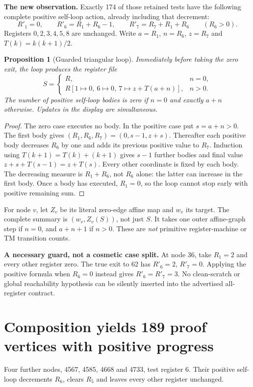 \documentclass[11pt]{article}
\newtheorem{proposition}{Proposition}[section]
\begin{document}
\textbf{The new observation.} Exactly 174 of those retained tests have the following complete positive self-loop action, already including that decrement:
\[
 R'_1=0,\qquad R'_6=R_1+R_6-1,\qquad
 R'_7=R_7+R_1+R_6\qquad(R_6>0).
\]
Registers $0,2,3,4,5,8$ are unchanged. Write $a=R_1$, $n=R_6$, $z=R_7$ and $T(k)=k(k+1)/2$.

\begin{proposition}[Guarded triangular loop]
Immediately before taking the zero exit, the loop produces the register file
\[
 S=\begin{cases}
 R,&n=0,\\
 R[1\mapsto0,\ 6\mapsto0,\ 7\mapsto z+T(a+n)],&n>0.
 \end{cases}
\]
The number of positive self-loop bodies is zero if $n=0$ and exactly $a+n$ otherwise. Updates in the display are simultaneous.
\end{proposition}
\begin{proof}
The zero case executes no body. In the positive case put $s=a+n>0$. The first body gives $(R_1,R_6,R_7)=(0,s-1,z+s)$. Thereafter each positive body decreases $R_6$ by one and adds its previous positive value to $R_7$. Induction using $T(k+1)=T(k)+(k+1)$ gives $s-1$ further bodies and final value $z+s+T(s-1)=z+T(s)$. Every other coordinate is fixed by each body. The decreasing measure is $R_1+R_6$, not $R_6$ alone: the latter can increase in the first body. Once a body has executed, $R_1=0$, so the loop cannot stop early with positive remaining sum.
\end{proof}

For node $v$, let $Z_v$ be its literal zero-edge affine map and $w_v$ its target. The complete summary is $(w_v,Z_v(S))$, not just $S$. It takes one outer affine-graph step if $n=0$, and $a+n+1$ if $n>0$. These are \emph{not} primitive register-machine or TM transition counts.

\textbf{A necessary guard, not a cosmetic case split.} At node 36, take $R_1=2$ and every other register zero. The true exit to 62 has $R'_6=2$, $R'_7=0$. Applying the positive formula when $R_6=0$ instead gives $R'_6=R'_7=3$. No clean-scratch or global reachability hypothesis can be silently inserted into the advertised all-register contract.

\newpage
\section{Composition yields 189 proof vertices with positive progress}
Four further nodes, 4567, 4585, 4668 and 4733, test register 6. Their positive self-loop decrements $R_6$, clears $R_5$ and leaves every other register unchanged.
\end{document}
